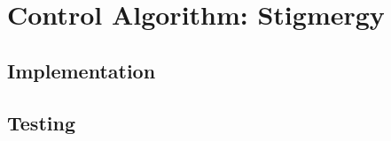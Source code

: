 
\chapter{Control Algorithm: Stigmergy}
\label{chap:stigmerty}

\section{Implementation}

\section{Testing}




